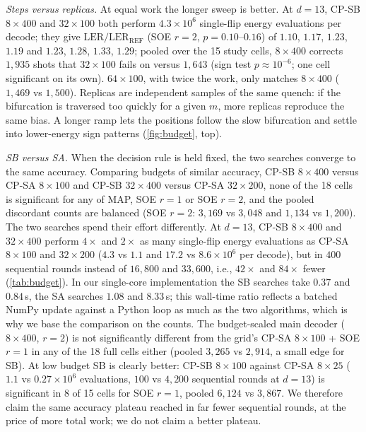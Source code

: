 \documentclass[journal]{IEEEtran}
\newcommand{\REF}{\mathrm{REF}}
\newcommand{\LER}{\mathrm{LER}}
\begin{document}
\emph{Steps versus replicas.} At equal work the longer sweep is better. At $d=13$, CP-SB $8\times400$ and $32\times100$ both perform $4.3\times10^6$ single-flip energy evaluations per decode; they give $\LER/\LER_\REF$ (SOE $r=2$, $p=0.10$--$0.16$) of $1.10$, $1.17$, $1.23$, $1.19$ and $1.23$, $1.28$, $1.33$, $1.29$; pooled over the 15 study cells, $8\times400$ corrects $1{,}935$ shots that $32\times100$ fails on versus $1{,}643$ (sign test $p\approx10^{-6}$; one cell significant on its own). $64\times100$, with twice the work, only matches $8\times400$ ($1{,}469$ vs $1{,}500$). Replicas are independent samples of the same quench: if the bifurcation is traversed too quickly for a given $m$, more replicas reproduce the same bias. A longer ramp lets the positions follow the slow bifurcation and settle into lower-energy sign patterns (\cref{fig:budget}, top).

\emph{SB versus SA.} When the decision rule is held fixed, the two searches converge to the same accuracy. Comparing budgets of similar accuracy, CP-SB $8\times400$ versus CP-SA $8\times100$ and CP-SB $32\times400$ versus CP-SA $32\times200$, none of the 18 cells is significant for any of MAP, SOE $r=1$ or SOE $r=2$, and the pooled discordant counts are balanced (SOE $r=2$: $3{,}169$ vs $3{,}048$ and $1{,}134$ vs $1{,}200$). The two searches spend their effort differently. At $d=13$, CP-SB $8\times400$ and $32\times400$ perform $4\times$ and $2\times$ as many single-flip energy evaluations as CP-SA $8\times100$ and $32\times200$ ($4.3$ vs $1.1$ and $17.2$ vs $8.6\times10^6$ per decode), but in $400$ sequential rounds instead of $16{,}800$ and $33{,}600$, i.e., $42\times$ and $84\times$ fewer (\cref{tab:budget}). In our single-core implementation the SB searches take $0.37$ and $0.84$\,s, the SA searches $1.08$ and $8.33$\,s; this wall-time ratio reflects a batched NumPy update against a Python loop as much as the two algorithms, which is why we base the comparison on the counts. The budget-scaled main decoder ($8\times400$, $r=2$) is not significantly different from the grid's CP-SA $8\times100$ + SOE $r=1$ in any of the 18 full cells either (pooled $3{,}265$ vs $2{,}914$, a small edge for SB). At low budget SB is clearly better: CP-SB $8\times100$ against CP-SA $8\times25$ ($1.1$ vs $0.27\times10^6$ evaluations, $100$ vs $4{,}200$ sequential rounds at $d=13$) is significant in 8 of 15 cells for SOE $r=1$, pooled $6{,}124$ vs $3{,}867$. We therefore claim the same accuracy plateau reached in far fewer sequential rounds, at the price of more total work; we do not claim a better plateau.
\end{document}
